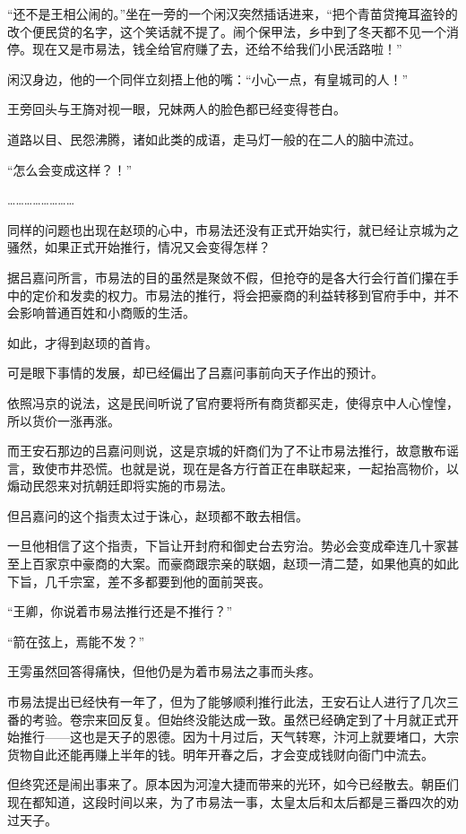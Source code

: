 “还不是王相公闹的。”坐在一旁的一个闲汉突然插话进来，“把个青苗贷掩耳盗铃的改个便民贷的名字，这个笑话就不提了。闹个保甲法，乡中到了冬天都不见一个消停。现在又是市易法，钱全给官府赚了去，还给不给我们小民活路啦！”

闲汉身边，他的一个同伴立刻捂上他的嘴：“小心一点，有皇城司的人！”

王旁回头与王旖对视一眼，兄妹两人的脸色都已经变得苍白。

道路以目、民怨沸腾，诸如此类的成语，走马灯一般的在二人的脑中流过。

“怎么会变成这样？！”

……………………

同样的问题也出现在赵顼的心中，市易法还没有正式开始实行，就已经让京城为之骚然，如果正式开始推行，情况又会变得怎样？

据吕嘉问所言，市易法的目的虽然是聚敛不假，但抢夺的是各大行会行首们攥在手中的定价和发卖的权力。市易法的推行，将会把豪商的利益转移到官府手中，并不会影响普通百姓和小商贩的生活。

如此，才得到赵顼的首肯。

可是眼下事情的发展，却已经偏出了吕嘉问事前向天子作出的预计。

依照冯京的说法，这是民间听说了官府要将所有商货都买走，使得京中人心惶惶，所以货价一涨再涨。

而王安石那边的吕嘉问则说，这是京城的奸商们为了不让市易法推行，故意散布谣言，致使市井恐慌。也就是说，现在是各方行首正在串联起来，一起抬高物价，以煽动民怨来对抗朝廷即将实施的市易法。

但吕嘉问的这个指责太过于诛心，赵顼都不敢去相信。

一旦他相信了这个指责，下旨让开封府和御史台去穷治。势必会变成牵连几十家甚至上百家京中豪商的大案。而豪商跟宗亲的联姻，赵顼一清二楚，如果他真的如此下旨，几千宗室，差不多都要到他的面前哭丧。

“王卿，你说着市易法推行还是不推行？”

“箭在弦上，焉能不发？”

王雱虽然回答得痛快，但他仍是为着市易法之事而头疼。

市易法提出已经快有一年了，但为了能够顺利推行此法，王安石让人进行了几次三番的考验。卷宗来回反复。但始终没能达成一致。虽然已经确定到了十月就正式开始推行——这也是天子的恩德。因为十月过后，天气转寒，汴河上就要堵口，大宗货物自此还能再赚上半年的钱。明年开春之后，才会变成钱财向衙门中流去。

但终究还是闹出事来了。原本因为河湟大捷而带来的光环，如今已经散去。朝臣们现在都知道，这段时间以来，为了市易法一事，太皇太后和太后都是三番四次的劝过天子。

